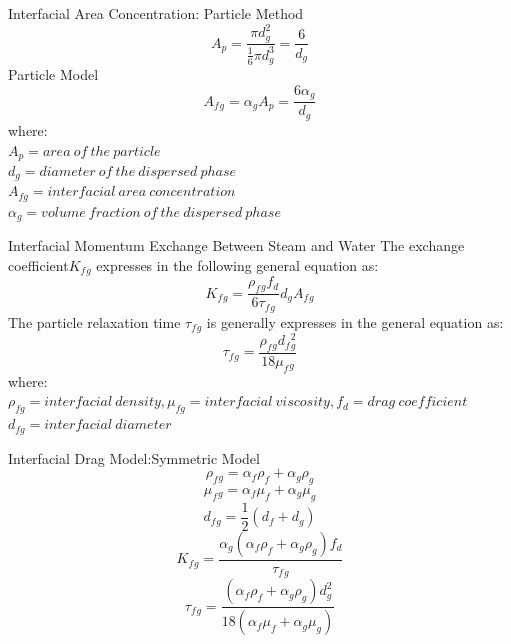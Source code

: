 \begin{frame}{Interfacial Area Concentration: Particle Method}
    \begin{equation}\label{satovr_eqn}
    A_p = \frac{\pi d_g^2}{\frac{1}{6}\pi d_g^3}=\frac{6}{d_g}
   \end{equation}
   \centering Particle Model
   \begin{equation} \label{iacm_eqn}
    A_f{}_g=\alpha_g A_p = \frac{6\alpha_g}{d_g}
   \end{equation}
where:\\
$A_p = area\:of\:the\:particle$\\
$d_g = diameter\:of\:the\:dispersed\:phase$\\
$A_{fg}= interfacial\:area\:concentration$\\
$\alpha_g = volume\:fraction\:of\:the\:dispersed\:phase$\\
\end{frame}

\begin{frame}{Interfacial Momentum Exchange Between Steam and Water}
    The exchange coefficient\:$K_f{}_g$ expresses in the following general equation as:
\begin{equation} \label{kfg_eqn}
    K_f{}_g = \frac{\rho_f{}_g f_d}{6 \tau_f{}_g} d_g A_f{}_g
\end{equation}
The particle relaxation time\: $\tau_f{}_g$ is generally expresses in the general equation as:
\begin{equation} \label{prt_eqn}
    \tau_f{}_g = \frac{\rho_f{}_g d_f{}_g^2}{18 \mu_f{}_g}
\end{equation}
where:\\
$\rho_{fg}=interfacial\:density,\mu_{fg}=interfacial\:viscosity, f_d = drag\:coefficient$\\ $d_{fg}=interfacial\:diameter$\\
\end{frame}

\begin{frame}{Interfacial Drag Model:Symmetric Model}
    \begin{equation} \label{rhofg_eqn}
    \rho_f{}_g = \alpha_f\rho_f + \alpha_g\rho_g
    \end{equation}
    \begin{equation} \label{mufg_eqn}
    \mu_f{}_g = \alpha_f\mu_f + \alpha_g\mu_g 
    \end{equation}
    \begin{equation} \label{dfg_eqn}
    d_f{}_g = \frac{1}{2} (d_f + d_g)
    \end{equation}
    \begin{equation}\label{kfgsym_eqn}
    K_f{}_g = \frac{\alpha_g(\alpha_f\rho_f+\alpha_g\rho_g)f_d}{\tau_f{}_g}
    \end{equation}
    \begin{equation}\label{taufgsym_eqn}
    \tau_f{}_g = \frac{(\alpha_f\rho_f+\alpha_g\rho_g) d_g^2}{18 (\alpha_f\mu_f + \alpha_g\mu_g)}
    \end{equation}
\end{frame}

